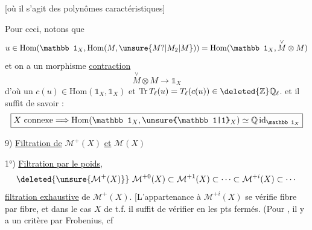 [où il s'agit des polynômes caractéristiques] %

Pour ceci, notons que %
\[
u\in\mathrm{Hom}(\mathbb 1_X,\mathrm{Hom}(M,\unsure{M?|M_2|M}))=\mathrm{Hom}(\mathbb 1_X,\overset{\vee}{M}\otimes M) %
\]
et on a un morphisme \uline{contraction} %
\[
\overset{\vee}{M}\otimes M\longrightarrow\mathbb 1_X %
\]
d'où un $c(u)\in\mathrm{Hom}(\mathbb 1_X,\mathbb 1_X)$ %
et  $\mathrm{Tr}\,T_\ell(u)=T_\ell(c(u))\in\deleted{\mathbb Z}\mathbb Q_\ell$. %
et il suffit de savoir : %
\[
\boxed{X\ \text{connexe}\Longrightarrow\mathrm{Hom}(\mathbb 1_X,\unsure{\mathbb 1|1}_X)\simeq\mathbb Q\,\mathrm{id}_{\mathbb 1_X}} %
\]

9) \uline{Filtration de} $\mathcal M^+(X)$ \uline{et} $\mathcal M(X)$ %

1°) \uline{Filtration par le poids},  %
\[
\deleted{\unsure{\mathcal M^+(X)}}\ \mathcal M^{+0}(X)\subset\mathcal M^{+1}(X)\subset\cdots\subset\mathcal M^{+i}(X)\subset\cdots %
\]
\uline{filtration exhaustive} de $\mathcal M^+(X)$. [L'appartenance %
à $\mathcal M^{+i}(X)$ se vérifie fibre par fibre,  %
 et dans le cas $X$ de t.f.  il suffit de %
vérifier en les pts fermés. (Pour  %
, il y a un critère par Frobenius, cf %

